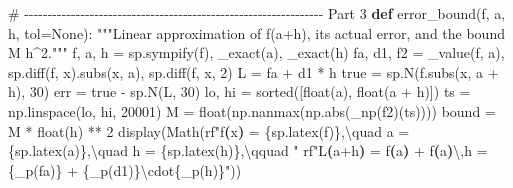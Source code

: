 \documentclass[
  letterpaper,
  DIV=11,
  numbers=noendperiod]{scrreprt}
\newenvironment{Shaded}{\begin{snugshade}}{\end{snugshade}}
\newcommand{\BuiltInTok}[1]{\textcolor[rgb]{0.00,0.23,0.31}{#1}}
\newcommand{\CharTok}[1]{\textcolor[rgb]{0.13,0.47,0.30}{#1}}
\newcommand{\CommentTok}[1]{\textcolor[rgb]{0.37,0.37,0.37}{#1}}
\newcommand{\DecValTok}[1]{\textcolor[rgb]{0.68,0.00,0.00}{#1}}
\newcommand{\ErrorTok}[1]{\textcolor[rgb]{0.68,0.00,0.00}{#1}}
\newcommand{\KeywordTok}[1]{\textcolor[rgb]{0.00,0.23,0.31}{\textbf{#1}}}
\newcommand{\NormalTok}[1]{\textcolor[rgb]{0.00,0.23,0.31}{#1}}
\newcommand{\OperatorTok}[1]{\textcolor[rgb]{0.37,0.37,0.37}{#1}}
\newcommand{\SpecialCharTok}[1]{\textcolor[rgb]{0.37,0.37,0.37}{#1}}
\newcommand{\VariableTok}[1]{\textcolor[rgb]{0.07,0.07,0.07}{#1}}
\newcommand{\VerbatimStringTok}[1]{\textcolor[rgb]{0.13,0.47,0.30}{#1}}
\theoremstyle{plain}
\theoremstyle{plain}
\theoremstyle{definition}
\theoremstyle{definition}
\theoremstyle{definition}
\theoremstyle{plain}
\theoremstyle{plain}
\theoremstyle{remark}
\begin{document}
\begin{Shaded}
\begin{Highlighting}[]
\CommentTok{\# {-}{-}{-}{-}{-}{-}{-}{-}{-}{-}{-}{-}{-}{-}{-}{-}{-}{-}{-}{-}{-}{-}{-}{-}{-}{-}{-}{-}{-}{-}{-}{-}{-}{-}{-}{-}{-}{-}{-}{-}{-}{-}{-}{-}{-}{-}{-}{-}{-}{-}{-}{-}{-}{-}{-}{-}{-}{-}{-}{-}{-}{-}{-}{-} Part 3}
\KeywordTok{def}\NormalTok{ error\_bound(f, a, h, tol}\OperatorTok{=}\VariableTok{None}\NormalTok{):}
    \CommentTok{"""Linear approximation of f(a+h), its actual error, and the bound M h\^{}2."""}
\NormalTok{    f, a, h }\OperatorTok{=}\NormalTok{ sp.sympify(f), \_exact(a), \_exact(h)}
\NormalTok{    fa, d1, f2 }\OperatorTok{=}\NormalTok{ \_value(f, a), sp.diff(f, x).subs(x, a), sp.diff(f, x, }\DecValTok{2}\NormalTok{)}
\NormalTok{    L }\OperatorTok{=}\NormalTok{ fa }\OperatorTok{+}\NormalTok{ d1 }\OperatorTok{*}\NormalTok{ h}
\NormalTok{    true }\OperatorTok{=}\NormalTok{ sp.N(f.subs(x, a }\OperatorTok{+}\NormalTok{ h), }\DecValTok{30}\NormalTok{)}
\NormalTok{    err }\OperatorTok{=}\NormalTok{ true }\OperatorTok{{-}}\NormalTok{ sp.N(L, }\DecValTok{30}\NormalTok{)}
\NormalTok{    lo, hi }\OperatorTok{=} \BuiltInTok{sorted}\NormalTok{([}\BuiltInTok{float}\NormalTok{(a), }\BuiltInTok{float}\NormalTok{(a }\OperatorTok{+}\NormalTok{ h)])}
\NormalTok{    ts }\OperatorTok{=}\NormalTok{ np.linspace(lo, hi, }\DecValTok{20001}\NormalTok{)}
\NormalTok{    M }\OperatorTok{=} \BuiltInTok{float}\NormalTok{(np.nanmax(np.}\BuiltInTok{abs}\NormalTok{(\_np(f2)(ts))))}
\NormalTok{    bound }\OperatorTok{=}\NormalTok{ M }\OperatorTok{*} \BuiltInTok{float}\NormalTok{(h) }\OperatorTok{**} \DecValTok{2}
\NormalTok{    display(Math(}\VerbatimStringTok{rf"f}\KeywordTok{(}\VerbatimStringTok{x}\KeywordTok{)}\VerbatimStringTok{ = }\SpecialCharTok{\{}\NormalTok{sp}\SpecialCharTok{.}\NormalTok{latex(f)}\SpecialCharTok{\}}\VerbatimStringTok{,}\ErrorTok{\textbackslash{}}\VerbatimStringTok{quad a = }\SpecialCharTok{\{}\NormalTok{sp}\SpecialCharTok{.}\NormalTok{latex(a)}\SpecialCharTok{\}}\VerbatimStringTok{,}\ErrorTok{\textbackslash{}}\VerbatimStringTok{quad h = }\SpecialCharTok{\{}\NormalTok{sp}\SpecialCharTok{.}\NormalTok{latex(h)}\SpecialCharTok{\}}\VerbatimStringTok{,}\ErrorTok{\textbackslash{}}\VerbatimStringTok{qquad "}
                 \VerbatimStringTok{rf"L}\KeywordTok{(}\VerbatimStringTok{a}\OperatorTok{+}\VerbatimStringTok{h}\KeywordTok{)}\VerbatimStringTok{ = f}\KeywordTok{(}\VerbatimStringTok{a}\KeywordTok{)}\VerbatimStringTok{ }\OperatorTok{+}\VerbatimStringTok{ f\textquotesingle{}}\KeywordTok{(}\VerbatimStringTok{a}\KeywordTok{)}\CharTok{\textbackslash{},}\VerbatimStringTok{h = }\SpecialCharTok{\{}\NormalTok{\_p(fa)}\SpecialCharTok{\}}\VerbatimStringTok{ }\OperatorTok{+}\VerbatimStringTok{ }\SpecialCharTok{\{}\NormalTok{\_p(d1)}\SpecialCharTok{\}}\ErrorTok{\textbackslash{}}\VerbatimStringTok{cdot}\SpecialCharTok{\{}\NormalTok{\_p(h)}\SpecialCharTok{\}}\VerbatimStringTok{"}\NormalTok{))}

\end{Highlighting}
\end{Shaded}
\end{document}
